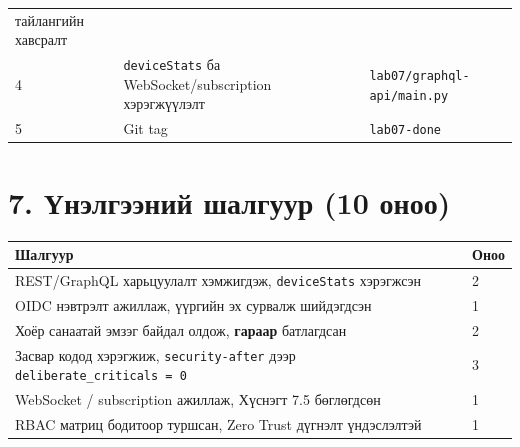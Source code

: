 \begin{longtable}[]{@{}lll@{}}
\begin{minipage}[t]{0.30\columnwidth}
тайлангийн хавсралт\strut
\end{minipage}\tabularnewline
\begin{minipage}[t]{0.30\columnwidth}\raggedright
4\strut
\end{minipage} & \begin{minipage}[t]{0.30\columnwidth}\raggedright
\texttt{deviceStats} ба WebSocket/subscription хэрэгжүүлэлт\strut
\end{minipage} & \begin{minipage}[t]{0.30\columnwidth}\raggedright
\texttt{lab07/\allowbreak{}graphql-api/\allowbreak{}main.\allowbreak{}py}\strut
\end{minipage}\tabularnewline
\begin{minipage}[t]{0.30\columnwidth}\raggedright
5\strut
\end{minipage} & \begin{minipage}[t]{0.30\columnwidth}\raggedright
Git tag\strut
\end{minipage} & \begin{minipage}[t]{0.30\columnwidth}\raggedright
\texttt{lab07-done}\strut
\end{minipage}\tabularnewline
\bottomrule
\end{longtable}\endgroup

\hypertarget{ux4afux43dux44dux43bux433ux44dux44dux43dux438ux439-ux448ux430ux43bux433ux443ux443ux440-10-ux43eux43dux43eux43e}{%
\section{7. Үнэлгээний шалгуур (10 оноо)}\label{ux4afux43dux44dux43bux433ux44dux44dux43dux438ux439-ux448ux430ux43bux433ux443ux443ux440-10-ux43eux43dux43eux43e}}

\begingroup\scriptsize\begin{longtable}[]{@{}ll@{}}
\toprule
Шалгуур & Оноо\tabularnewline
\midrule
\endhead
REST/GraphQL харьцуулалт хэмжигдэж, \texttt{deviceStats} хэрэгжсэн & 2\tabularnewline
OIDC нэвтрэлт ажиллаж, үүргийн эх сурвалж шийдэгдсэн & 1\tabularnewline
Хоёр санаатай эмзэг байдал олдож, \textbf{гараар} батлагдсан & 2\tabularnewline
Засвар кодод хэрэгжиж, \texttt{security-after} дээр \texttt{deliberate\_\allowbreak{}criticals\ =\allowbreak{}\ 0} & 3\tabularnewline
WebSocket / subscription ажиллаж, Хүснэгт 7.5 бөглөгдсөн & 1\tabularnewline
RBAC матриц бодитоор туршсан, Zero Trust дүгнэлт үндэслэлтэй & 1\tabularnewline
\bottomrule
\end{longtable}\endgroup

